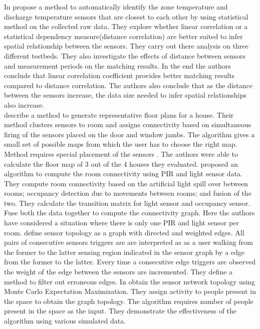In \cite{Koc:2014:CLC:2674061.2674075} \citeauthor{Koc:2014:CLC:2674061.2674075} propose a method to automatically identify the zone temperature and discharge temperature sensors that are closest to each other by using statistical method on the collected raw data. They explore whether linear correlation or a statistical dependency measure(distance correlation) are better suited to infer spatial relationship between the sensors. They carry out there analysis on three different testbeds. They also investigate the effects of distance between sensors and measurement periods on the matching results. In the end the authors conclude that linear correlation coefficient provides better matching results compared to distance correlation. The authors also conclude that as the distance between the sensors increase, the data size needed to infer spatial relationships also increase.\\
\citeauthor{Lu:2014:SBS:2648771.2629441}\cite{Lu:2014:SBS:2648771.2629441} describe a method to generate representative floor plans for a house. Their method clusters sensors to room and assigns connectivity based on simultaneous firing of the sensors placed on the door and window jambs. The algorithm gives a small set of possible maps from which the user has to choose the right map. Method requires special placement of the sensors . The authors were able to calculate the floor map of 3 out of the 4 houses they evaluated.  
 \citeauthor{ellis2012creating}\cite{ellis2012creating} proposed an algorithm to compute the room connectivity using  PIR and light sensor data. They compute room connectivity based on the artificial light spill over between rooms; occupancy detection due to movements between
  rooms; and fusion of the two. They calculate the transition matrix for light sensor and occupancy sensor. Fuse both the data together to compute the connectivity graph. Here the authors have considered a situation where there is only one PIR and light sensor per room.
\citeauthor{muller2014automated} define  sensor topology as a graph with directed and weighted edges. All pairs of consecutive sensors triggers are are interpreted as as a user walking from the former to the latter sensing region indicated in the sensor 
graph by a edge from the former to the latter. Every time a consecutive edge triggers are observed the weight of the edge between the sensors are incremented. They define a method to filter out erroneous edges.
In \cite{marinakis2005learning} \citeauthor{marinakis2005learning} obtain the sensor network topology using Monte Carlo Expectation Maximization. They assign activity to people present in the space to obtain the graph topology. The algorithm requires number of people present in the space as the input. They demonstrate the effectiveness of the algorithm using various simulated data. 




